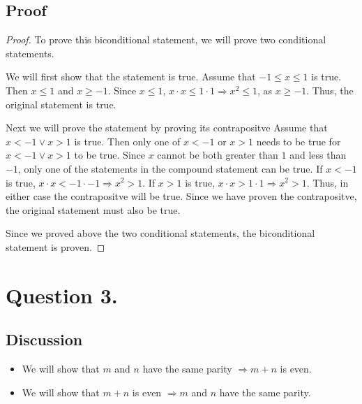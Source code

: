 \documentclass{article}
\begin{document}
    \subsection*{Proof}
    \begin{proof}
        To prove this biconditional statement, we will prove two conditional statements.

        \noindent We will first show that the statement  is true. Assume that $ -1 \le x \le 1 $ is true.
        Then $ x \le 1 $ and $ x \ge -1 $. Since $ x \le 1 $, $ x \cdot x \le 1 \cdot 1 \Rightarrow x^2 \le 1 $, as $ x \ge -1 $. Thus, the original statement is true.

        \noindent Next we will prove the statement  by proving its contrapositve 
        Assume that $ x < -1 \vee x > 1 $ is true. Then only one of $ x < -1 $ or $ x > 1 $ needs to be true for $ x < -1 \vee x > 1 $ to be true. 
        Since $ x $ cannot be both greater than $ 1 $ and less than $ -1 $, only one of the statements in the compound statement can be true. 
        If $ x < -1 $ is true, $ x \cdot x < -1 \cdot -1 \Rightarrow x^2 > 1 $. If $ x > 1 $ is true, $ x \cdot x > 1 \cdot 1 \Rightarrow x^2 > 1 $.
        Thus, in either case the contrapositve will be true. Since we have proven the contrapositve, the original statement must also be true.

        \noindent Since we proved above the two conditional statements, the biconditional statement  is proven.
        
    \end{proof}

    \section*{Question 3.}
    \subsection*{Discussion}
    \begin{itemize}
        \item We will show that $ m $ and $ n $ have the same parity $ \Rightarrow m + n $ is even.
        \item We will show that $ m + n $ is even $ \Rightarrow m $ and $ n $ have the same parity.
    \end{itemize}
\end{document}
